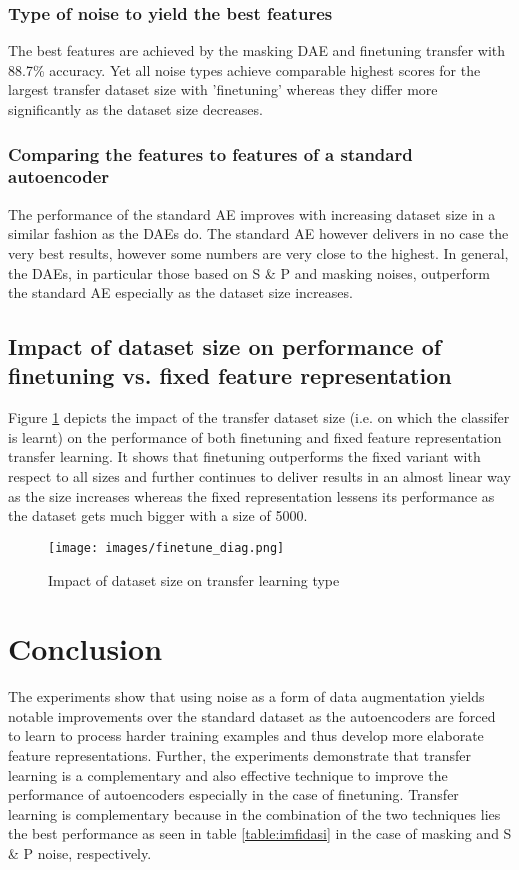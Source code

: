 \documentclass[10pt, a4paper]{article}
\begin{document}
	\subsubsection{Type of noise to yield the best features}
	The best features are achieved by the masking DAE and finetuning transfer with 88.7\% accuracy. Yet all noise types achieve comparable highest scores for the largest transfer dataset size with 'finetuning' whereas they differ more significantly as the dataset size decreases. 
	
	\subsubsection{Comparing the features to features of a standard autoencoder}
    The performance of the standard AE improves with increasing dataset size in a similar fashion as the DAEs do. The standard AE however delivers in no case the very best results, however some numbers are very close to the highest. In general, the DAEs, in particular those based on S \& P and masking noises, outperform the standard AE especially as the dataset size increases.
    
    \subsection{Impact of dataset size on performance of finetuning vs. fixed feature representation}
    Figure \ref{fig:diagfine} depicts the impact of the transfer dataset size (i.e. on which the classifer is learnt) on the performance of both finetuning and fixed feature representation transfer learning. It shows that finetuning outperforms the fixed variant with respect to all sizes and further continues to deliver results in an almost linear way as the size increases whereas the fixed representation lessens its performance as the dataset gets much bigger with a size of 5000. 
    
    \begin{figure}[h]
    \centering
    \texttt{[image: images/finetune\_diag.png]}
    \caption{Impact of dataset size on transfer learning type}
    \label{fig:diagfine}
    \end{figure}
	
	\section{Conclusion}
	The experiments show that using noise as a form of data augmentation yields notable improvements over the standard dataset as the autoencoders are forced to learn to process harder training examples and thus develop more elaborate feature representations. Further, the experiments demonstrate that transfer learning is a complementary and also effective technique to improve the performance of autoencoders especially in the case of finetuning. Transfer learning is complementary because in the combination of the two techniques lies the best performance as seen in table \ref{table:imfidasi} in the case of masking and S \& P noise, respectively.
	
\end{document}
